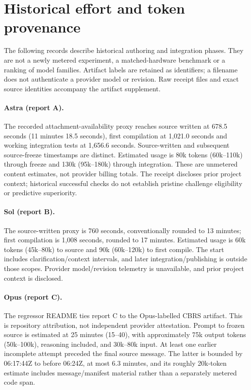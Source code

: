 \section{Historical effort and token provenance}
\label{sup:effort}

The following records describe historical authoring and integration phases.
They are not a newly metered experiment, a matched-hardware benchmark or a
ranking of model families. Artifact labels are retained as identifiers; a
filename does not authenticate a provider model or revision. Raw receipt files
and exact source identities accompany the artifact supplement.

\paragraph{Astra (report A).}
The recorded attachment-availability proxy reaches source written at 678.5
seconds (11 minutes 18.5 seconds), first compilation at 1,021.0 seconds and
working integration tests at 1,656.6 seconds. Source-written and subsequent
source-freeze timestamps are distinct. Estimated usage is 80k tokens
(60k--110k) through freeze and 130k (95k--180k) through integration. These are
unmetered content estimates, not provider billing totals. The receipt discloses
prior project context; historical successful checks do not establish pristine
challenge eligibility or predictive superiority.

\paragraph{Sol (report B).}
The source-written proxy is 760 seconds, conventionally rounded to 13 minutes;
first compilation is 1,008 seconds, rounded to 17 minutes. Estimated usage is
60k tokens (45k--80k) to source and 90k (60k--120k) to first compile. The start
includes clarification/context intervals, and later integration/publishing is
outside those scopes. Provider model/revision telemetry is unavailable, and
prior project context is disclosed.

\paragraph{Opus (report C).}
The regressor README ties report C to the Opus-labelled CBRS artifact. This is
repository attribution, not independent provider attestation. Prompt to frozen
source is estimated at 25 minutes (15--40), with approximately 75k output tokens
(50k--100k), reasoning included, and 30k--80k input. At least one earlier
incomplete attempt preceded the final source message. The latter is bounded by
06:17:44Z to before 06:24Z, at most 6.3 minutes, and its roughly 20k-token estimate
includes message/manifest material rather than a separately metered code span.

